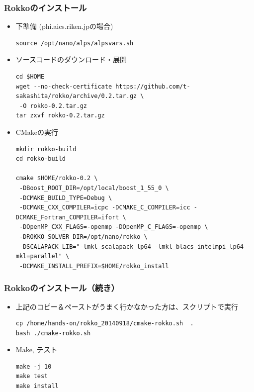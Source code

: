\begin{frame}[c,fragile]
  \frametitle{Rokkoのインストール}
  \begin{itemize}
  \item 下準備 (phi.aics.riken.jpの場合)
\begin{lstlisting}[style=shstyle]
source /opt/nano/alps/alpsvars.sh
\end{lstlisting}
  \item ソースコードのダウンロード・展開
\begin{lstlisting}[style=shstyle]
cd $HOME
wget --no-check-certificate https://github.com/t-sakashita/rokko/archive/0.2.tar.gz \
 -O rokko-0.2.tar.gz
tar zxvf rokko-0.2.tar.gz
\end{lstlisting}
  \item CMakeの実行
\begin{lstlisting}[style=shstyle]
mkdir rokko-build
cd rokko-build

cmake $HOME/rokko-0.2 \
 -DBoost_ROOT_DIR=/opt/local/boost_1_55_0 \
 -DCMAKE_BUILD_TYPE=Debug \
 -DCMAKE_CXX_COMPILER=icpc -DCMAKE_C_COMPILER=icc -DCMAKE_Fortran_COMPILER=ifort \
 -DOpenMP_CXX_FLAGS=-openmp -DOpenMP_C_FLAGS=-openmp \
 -DROKKO_SOLVER_DIR=/opt/nano/rokko \
 -DSCALAPACK_LIB="-lmkl_scalapack_lp64 -lmkl_blacs_intelmpi_lp64 -mkl=parallel" \
 -DCMAKE_INSTALL_PREFIX=$HOME/rokko_install
\end{lstlisting}
  \end{itemize}
\end{frame}

\begin{frame}[c,fragile]
  \frametitle{Rokkoのインストール（続き）}
  \begin{itemize}
  \item 上記のコピー＆ペーストがうまく行かなかった方は、スクリプトで実行
\begin{lstlisting}[style=shstyle]
cp /home/hands-on/rokko_20140918/cmake-rokko.sh  .
bash ./cmake-rokko.sh
\end{lstlisting}
  \item Make, テスト
\begin{lstlisting}[style=shstyle]
make -j 10
make test
make install
\end{lstlisting}
  \end{itemize}
\end{frame}

